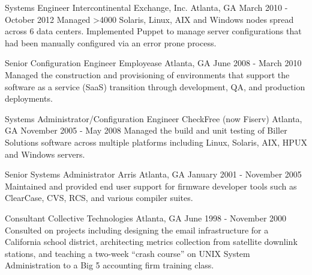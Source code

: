 \begin{cventries}
  \cventry
    {Systems Engineer} %
    {Intercontinental Exchange, Inc.} %
    {Atlanta, GA} %
    {March 2010 - October 2012} %
    {Managed >4000 Solaris, Linux, AIX and Windows nodes spread across 6 data centers. Implemented Puppet to manage server configurations that had been manually configured via an error prone process.}

  \cventry
    {Senior Configuration Engineer} %
    {Employease} %
    {Atlanta, GA} %
    {June 2008 - March 2010} %
    {Managed the construction and provisioning of environments that support the software as a service (SaaS) transition through development, QA, and production deployments.}

  \cventry
    {Systems Administrator/Configuration Engineer} %
    {CheckFree (now Fiserv)} %
    {Atlanta, GA} %
    {November 2005 - May 2008} %
    {Managed the build and unit testing of Biller Solutions software across multiple platforms including Linux, Solaris, AIX, HPUX and Windows servers.}

  \cventry
    {Senior Systems Administrator} %
    {Arris} %
    {Atlanta, GA} %
    {January 2001 - November 2005} %
    {Maintained and provided end user support for firmware developer tools such as ClearCase, CVS, RCS, and various compiler suites.}

  \cventry
    {Consultant} %
    {Collective Technologies} %
    {Atlanta, GA} %
    {June 1998 - November 2000} %
    {Consulted on projects including designing the email infrastructure for a California school district, architecting metrics collection from satellite downlink stations, and teaching a two-week “crash course” on UNIX System Administration to a Big 5 accounting firm training class.}

\end{cventries}

